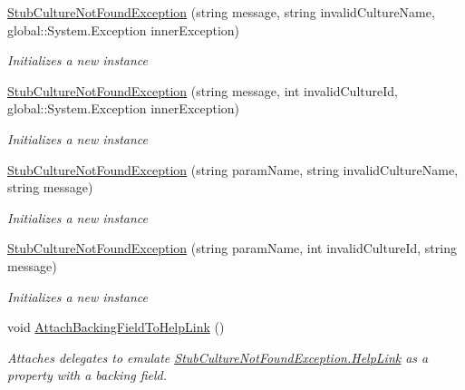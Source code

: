\begin{DoxyCompactItemize}
\hyperlink{class_system_1_1_globalization_1_1_fakes_1_1_stub_culture_not_found_exception_a0f92f71989f58eb553e628febba131c6}{Stub\-Culture\-Not\-Found\-Exception} (string message, string invalid\-Culture\-Name, global\-::\-System.\-Exception inner\-Exception)
\begin{DoxyCompactList}\small\item\em Initializes a new instance\end{DoxyCompactList}\item 
\hyperlink{class_system_1_1_globalization_1_1_fakes_1_1_stub_culture_not_found_exception_a85f3ee1076045d022d2fc2c9511f962f}{Stub\-Culture\-Not\-Found\-Exception} (string message, int invalid\-Culture\-Id, global\-::\-System.\-Exception inner\-Exception)
\begin{DoxyCompactList}\small\item\em Initializes a new instance\end{DoxyCompactList}\item 
\hyperlink{class_system_1_1_globalization_1_1_fakes_1_1_stub_culture_not_found_exception_a18a3c02e689cfe88323483c983cfb7bf}{Stub\-Culture\-Not\-Found\-Exception} (string param\-Name, string invalid\-Culture\-Name, string message)
\begin{DoxyCompactList}\small\item\em Initializes a new instance\end{DoxyCompactList}\item 
\hyperlink{class_system_1_1_globalization_1_1_fakes_1_1_stub_culture_not_found_exception_a64a5478cac60eeea2c6601b3aa471651}{Stub\-Culture\-Not\-Found\-Exception} (string param\-Name, int invalid\-Culture\-Id, string message)
\begin{DoxyCompactList}\small\item\em Initializes a new instance\end{DoxyCompactList}\item 
void \hyperlink{class_system_1_1_globalization_1_1_fakes_1_1_stub_culture_not_found_exception_adeb6bff8e0cfc0eee7447a3f0184faeb}{Attach\-Backing\-Field\-To\-Help\-Link} ()
\begin{DoxyCompactList}\small\item\em Attaches delegates to emulate \hyperlink{class_system_1_1_globalization_1_1_fakes_1_1_stub_culture_not_found_exception_a7589c69ded70b772ccee34bd06bf95ab}{Stub\-Culture\-Not\-Found\-Exception.\-Help\-Link} as a property with a backing field.\end{DoxyCompactList}\item 

\end{DoxyCompactItemize}
